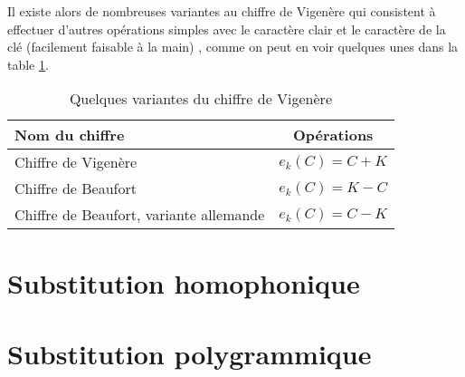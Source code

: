 Il existe alors de nombreuses variantes au chiffre de Vigenère qui
consistent à effectuer d'autres opérations simples avec le caractère
clair et le caractère de la clé (facilement faisable à la main) ,
comme on peut en voir quelques unes dans la table \ref{tab:variantesvigenere}. 
\begin{table}[h]
  \caption{Quelques variantes du chiffre de Vigenère}
  \label{tab:variantesvigenere}
  \begin{center}
    \begin{tabular}{|l|c|}
      \hline
      \textbf{Nom du chiffre} & \textbf{Opérations} \\
      \hline
      Chiffre de Vigenère & $e_k(C) = C + K$ \\ 
      \hline
      Chiffre de Beaufort & $e_k(C) = K - C$ \\
      \hline
      Chiffre de Beaufort, variante allemande & $e_k(C) = C - K$ \\
      \hline
    \end{tabular}
  \end{center}
\end{table}

\section{Substitution homophonique}
\section{Substitution polygrammique}

